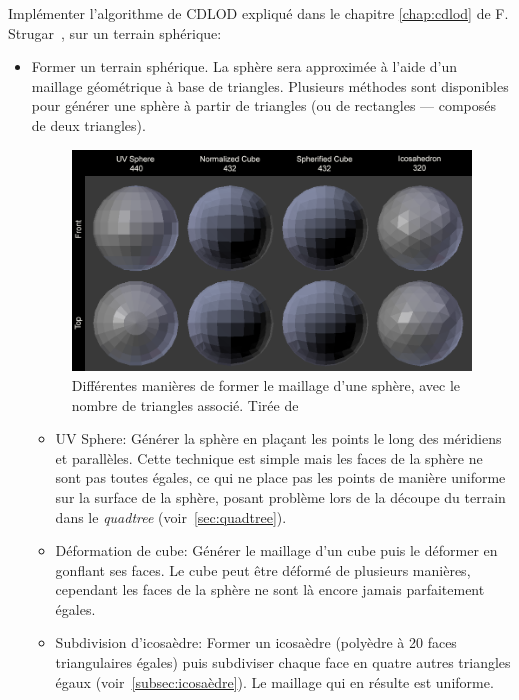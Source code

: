 Implémenter l'algorithme de CDLOD expliqué dans le chapitre \ref{chap:cdlod} de F.
Strugar~\cite{CDLOD}, sur un terrain sphérique:\\
\begin{itemize}
\item 
  Former un terrain sphérique. La sphère sera approximée à l'aide d'un
    maillage géométrique à base de triangles. Plusieurs méthodes sont
    disponibles pour générer une sphère à partir de triangles (ou de
    rectangles --- composés de deux triangles).


  \begin{figure}[!ht]
  \centerline{
    \includegraphics[width=12cm]{img/spheres.png}}
     \caption[Sphère génération]{Différentes manières de former le maillage d'une sphère, avec le nombre de triangles associé. Tirée de\protect\footnotemark}
    \label{fig:spheres}
    \end{figure}
  

  \begin{itemize}
  \item
    UV Sphere: Générer la sphère en plaçant les points le long des
      méridiens et parallèles. Cette technique est simple mais les faces
      de la sphère ne sont pas toutes égales, ce qui ne place pas les
      points de manière uniforme sur la surface de la sphère, posant
      problème lors de la découpe du terrain dans le \emph{quadtree}
      (voir~\ref{sec:quadtree}).
  \item
    Déformation de cube: Générer le maillage d'un cube puis le déformer en
      gonflant ses faces. Le cube peut être déformé de plusieurs manières,
      cependant les faces de la sphère ne sont là encore jamais
      parfaitement égales.
  \item
    Subdivision d'icosaèdre: Former un icosaèdre (polyèdre à 20 faces
      triangulaires égales) puis subdiviser chaque face en quatre autres
      triangles égaux (voir~\ref{subsec:icosaèdre}). Le maillage qui en
      résulte est uniforme.
  \end{itemize}


\end{itemize}
